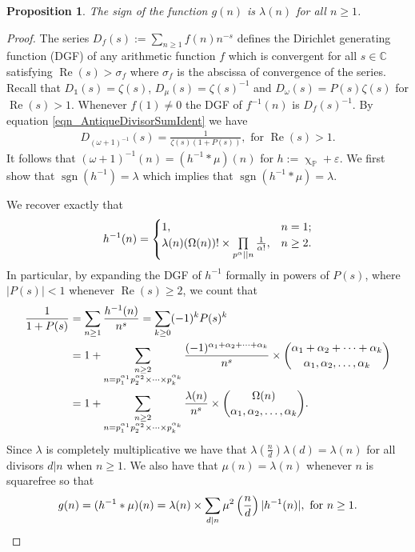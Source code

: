 \documentclass[11pt,reqno,a4letter]{article}
\numberwithin{equation}{section}
\numberwithin{figure}{section}
\numberwithin{table}{section}
\newcommand{\cf}{\textit{cf.\ }}
\renewcommand{\chi}{\upchi}
\theoremstyle{plain}
\newtheorem{prop}[theorem]{Proposition}
\numberwithin{theorem}{section}
\theoremstyle{definition}
\renewcommand{\Re}{\operatorname{Re}}
\begin{document}
\begin{prop}
\label{prop_SignageDirInvsOfPosBddArithmeticFuncs_v1} 
The sign of the function $g(n)$ is $\lambda(n)$ for all $n \geq 1$. 
\end{prop} 
\begin{proof} 
The series $D_f(s) := \sum_{n \geq 1} f(n) n^{-s}$ defines the 
Dirichlet generating function (DGF) of any 
arithmetic function $f$ which is convergent for all $s \in \mathbb{C}$ satisfying 
$\Re(s) > \sigma_f$ where $\sigma_f$ is the abscissa of convergence of the series. 
Recall that $D_{\mathds{1}}(s) = \zeta(s)$, $D_{\mu}(s) = \zeta(s)^{-1}$ and 
$D_{\omega}(s) = P(s) \zeta(s)$ for $\Re(s) > 1$. 
Whenever $f(1) \neq 0$ the DGF of $f^{-1}(n)$ is $D_f(s)^{-1}$. 
By equation \eqref{eqn_AntiqueDivisorSumIdent} we have 
\begin{align} 
\label{eqn_DGF_of_gInvn} 
D_{(\omega+1)^{-1}}(s) = \frac{1}{\zeta(s) (1+P(s))}, \text{ for } \Re(s) > 1. 
\end{align} 
It follows that $(\omega + 1)^{-1}(n) = (h^{-1} \ast \mu)(n)$ for 
$h := \chi_{\mathbb{P}} + \varepsilon$. 
We first show that $\operatorname{sgn}(h^{-1}) = \lambda$ which implies that 
$\operatorname{sgn}(h^{-1} \ast \mu) = \lambda$. 

We recover exactly that \cite[\cf \S 2]{FROBERG-1968} 
\begin{equation} 
\notag 
h^{-1}(n) = \begin{cases} 
     1, & n = 1; \\ 
     \lambda(n) (\Omega(n))! \times \prod\limits_{p^{\alpha} || n} \frac{1}{\alpha!}, & n \geq 2. 
     \end{cases}
\end{equation} 
In particular, by expanding the DGF of 
$h^{-1}$ formally in powers of $P(s)$, where $|P(s)| < 1$ whenever $\Re(s) \geq 2$, 
we count that 
\begin{align}
\notag
\frac{1}{1+P(s)} & = \sum_{n \geq 1} \frac{h^{-1}(n)}{n^s} = \sum_{k \geq 0} (-1)^k P(s)^k \\ 
\notag
     & = 
     1 + \sum_{\substack{n \geq 2 \\ n =p_1^{\alpha_1}p_2^{\alpha_2} \times \cdots \times p_k^{\alpha_k}}} 
     \frac{(-1)^{\alpha_1+\alpha_2+\cdots+\alpha_k}}{n^s} \times 
     \binom{\alpha_1+\alpha_2+\cdots+\alpha_k}{\alpha_1,\alpha_2,\ldots,\alpha_k} \\ 
\label{eqn_COmeganMultinomExp_as_DGFSeries_v2}
     & = 
     1 + \sum_{\substack{n \geq 2 \\ n =p_1^{\alpha_1}p_2^{\alpha_2} \times \cdots \times p_k^{\alpha_k}}} 
     \frac{\lambda(n)}{n^s} \times \binom{\Omega(n)}{\alpha_1,\alpha_2,\ldots,\alpha_k}. 
\end{align}
Since $\lambda$ is completely multiplicative we have that 
$\lambda\left(\frac{n}{d}\right) \lambda(d) = \lambda(n)$ for all divisors 
$d|n$ when $n \geq 1$. We also have that $\mu(n) = \lambda(n)$ 
whenever $n$ is squarefree so that
\[
g(n) = (h^{-1} \ast \mu)(n) = \lambda(n) \times 
     \sum_{d|n} \mu^2\left(\frac{n}{d}\right) |h^{-1}(n)|, \text{ for } n \geq 1. 
     \qedhere 
\]
\end{proof} 
\end{document}
